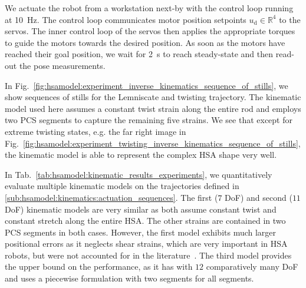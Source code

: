 We actuate the robot from a workstation next-by with the control loop running at \SI{10}{Hz}. The control loop communicates motor position setpoints $u_\mathrm{d} \in \mathbb{R}^4$ to the servos. The inner control loop of the servos then applies the appropriate torques to guide the motors towards the desired position. As soon as the motors have reached their goal position, we wait for \SI{2}{s} to reach steady-state and then read-out the pose measurements.

In Fig.~\ref{fig:hsamodel:experiment_inverse_kinematics_sequence_of_stills}, we show sequences of stills for the Lemniscate and twisting trajectory. The kinematic model used here assumes a constant twist strain along the entire rod and employs two \gls{PCS} segments to capture the remaining five strains. We see that except for extreme twisting states, e.g. the far right image in Fig.~\ref{fig:hsamodel:experiment_twisting_inverse_kinematics_sequence_of_stills}, the kinematic model is able to represent the complex \gls{HSA} shape very well.

In Tab.~\ref{tab:hsamodel:kinematic_results_experiments}, we quantitatively evaluate multiple kinematic models on the trajectories defined in \ref{sub:hsamodel:kinematics:actuation_sequences}. 
The first ($7$ DoF) and second ($11$ DoF) kinematic models are very similar as both assume constant twist and constant stretch along the entire \gls{HSA}. The other strains are contained in two \gls{PCS} segments in both cases. However, the first model exhibits much larger positional errors as it neglects shear strains, which are very important in \gls{HSA} robots, but were not accounted for in the literature~\cite{garg2022kinematic}.
The third model provides the upper bound on the performance, as it has with $12$ comparatively many DoF and uses a piecewise formulation with two segments for all segments. 
